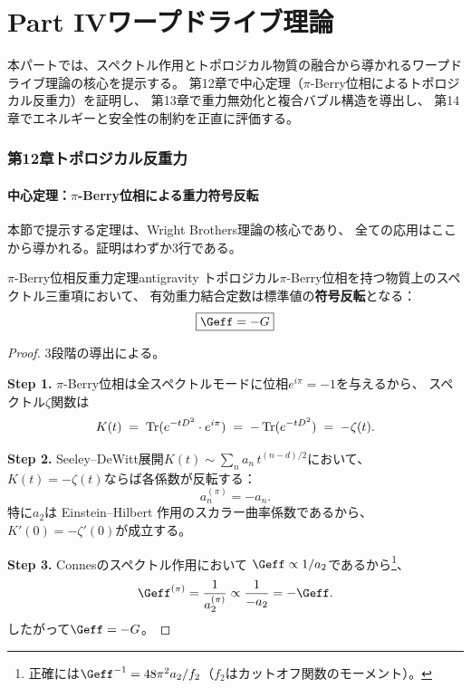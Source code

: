 
\newpage


\part*{Part IV\quad ワープドライブ理論}

\vspace{1em}
\noindent
本パートでは、スペクトル作用とトポロジカル物質の融合から導かれるワープドライブ理論の核心を提示する。
第12章で中心定理（$\pi$-Berry位相によるトポロジカル反重力）を証明し、
第13章で重力無効化と複合バブル構造を導出し、
第14章でエネルギーと安全性の制約を正直に評価する。



\section{第12章\quad トポロジカル反重力}
\label{ch:topological-antigravity}

\subsection{中心定理：$\pi$-Berry位相による重力符号反転}
\label{sec:12.1}

本節で提示する定理は、Wright Brothers理論の核心であり、
全ての応用はここから導かれる。証明はわずか3行である。

\begin{keytheorem}{$\pi$-Berry位相反重力定理}{antigravity}
トポロジカル$\pi$-Berry位相を持つ物質上のスペクトル三重項において、
有効重力結合定数は標準値の\textbf{符号反転}となる：
\[
\boxed{\Geff = -G}
\]
\end{keytheorem}

\begin{proof}
3段階の導出による。

\textbf{Step 1.} $\pi$-Berry位相は全スペクトルモードに位相$e^{i\pi}=-1$を与えるから、
スペクトル$\zeta$関数は
\[
K(t) \;=\; \operatorname{Tr}(e^{-tD^2} \cdot e^{i\pi}) \;=\; -\operatorname{Tr}(e^{-tD^2}) \;=\; -\zeta(t).
\]

\textbf{Step 2.} Seeley--DeWitt展開$K(t) \sim \sum_n a_n \, t^{(n-d)/2}$において、
$K(t) = -\zeta(t)$ならば各係数が反転する：
\[
a_n^{(\pi)} = -a_n.
\]
特に$a_2$は Einstein--Hilbert 作用のスカラー曲率係数であるから、
$K'(0) = -\zeta'(0)$が成立する。

\textbf{Step 3.} Connesのスペクトル作用において
$\Geff \propto 1/a_2$であるから\footnote{%
正確には$\Geff^{-1} = 48\pi^2 a_2 / f_2$（$f_2$はカットオフ関数のモーメント）。}、
\[
\Geff^{(\pi)} = \frac{1}{a_2^{(\pi)}} \propto \frac{1}{-a_2} = -\Geff.
\]
したがって$\Geff = -G$。\qedhere
\end{proof}

